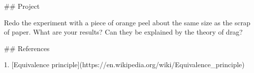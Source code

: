 ## Project

Redo the experiment with a piece of orange peel about the same size as the scrap of paper.  What are your results?  Can they be explained by the theory of drag?



## References

1. [Equivalence principle](https://en.wikipedia.org/wiki/Equivalence_principle)




